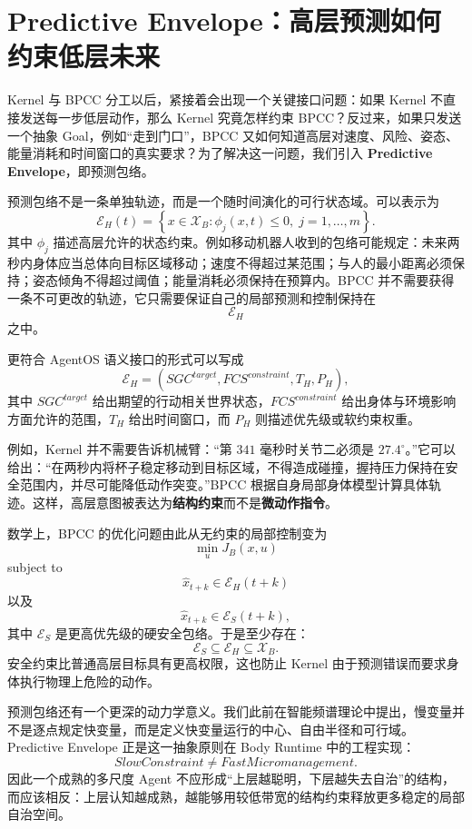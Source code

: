 \section{Predictive Envelope：高层预测如何约束低层未来}

Kernel 与 BPCC 分工以后，紧接着会出现一个关键接口问题：如果 Kernel 不直接发送每一步低层动作，那么 Kernel 究竟怎样约束 BPCC？反过来，如果只发送一个抽象 Goal，例如“走到门口”，BPCC 又如何知道高层对速度、风险、姿态、能量消耗和时间窗口的真实要求？为了解决这一问题，我们引入 \textbf{Predictive Envelope}，即预测包络。

预测包络不是一条单独轨迹，而是一个随时间演化的可行状态域。可以表示为
\[
\mathcal E_H(t)
=
\left\{
x\in\mathcal X_B:
\phi_j(x,t)\leq0,\;
j=1,\ldots,m
\right\}.
\]
其中 $\phi_j$ 描述高层允许的状态约束。例如移动机器人收到的包络可能规定：未来两秒内身体应当总体向目标区域移动；速度不得超过某范围；与人的最小距离必须保持；姿态倾角不得超过阈值；能量消耗必须保持在预算内。BPCC 并不需要获得一条不可更改的轨迹，它只需要保证自己的局部预测和控制保持在
\[
\mathcal E_H
\]
之中。

更符合 AgentOS 语义接口的形式可以写成
\[
\mathcal E_H
=
\left(
SGC^{target},
FCS^{constraint},
T_H,
P_H
\right),
\]
其中 $SGC^{target}$ 给出期望的行动相关世界状态，$FCS^{constraint}$ 给出身体与环境影响方面允许的范围，$T_H$ 给出时间窗口，而 $P_H$ 则描述优先级或软约束权重。

例如，Kernel 并不需要告诉机械臂：“第 $341$ 毫秒时关节二必须是 $27.4^\circ$。”它可以给出：“在两秒内将杯子稳定移动到目标区域，不得造成碰撞，握持压力保持在安全范围内，并尽可能降低动作突变。”BPCC 根据自身局部身体模型计算具体轨迹。这样，高层意图被表达为\textbf{结构约束}而不是\textbf{微动作指令}。

数学上，BPCC 的优化问题由此从无约束的局部控制变为
\[
\min_{u}
J_B(x,u)
\]
subject to
\[
\hat x_{t+k}\in\mathcal E_H(t+k)
\]
以及
\[
\hat x_{t+k}\in\mathcal E_S(t+k),
\]
其中 $\mathcal E_S$ 是更高优先级的硬安全包络。于是至少存在：
\[
\mathcal E_S
\subseteq
\mathcal E_H
\subseteq
\mathcal X_B.
\]
安全约束比普通高层目标具有更高权限，这也防止 Kernel 由于预测错误而要求身体执行物理上危险的动作。

预测包络还有一个更深的动力学意义。我们此前在智能频谱理论中提出，慢变量并不是逐点规定快变量，而是定义快变量运行的中心、自由半径和可行域。Predictive Envelope 正是这一抽象原则在 Body Runtime 中的工程实现：
\[
SlowConstraint
\neq
FastMicromanagement.
\]
因此一个成熟的多尺度 Agent 不应形成“上层越聪明，下层越失去自治”的结构，而应该相反：上层认知越成熟，越能够用较低带宽的结构约束释放更多稳定的局部自治空间。

